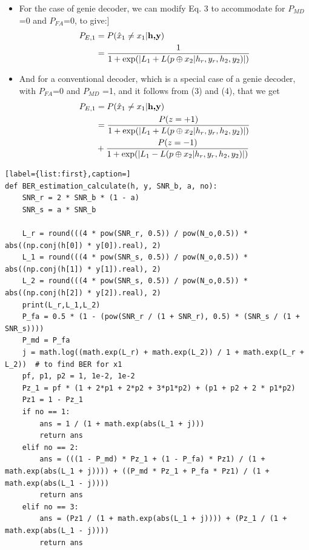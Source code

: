 \documentclass[conference]{IEEEtran}
\begin{document}
\begin{itemize}
\item For the case of genie decoder, we can modify Eq. 3 to accommodate for $P_{MD}$=0 and $P_{FA}$=0, to give:]
\begin{equation}
\begin{split}
P_{E,1} & = P(\hat x_1\neq x_1 | \textbf{h,y})\\
 & = {1\over 1+\exp(| L_{1}+L(p\oplus x_{2}| h_{r},y_{r},h_{2},y_{2})|)}\\
\end{split}
\end{equation}
\item And for a conventional decoder, which is a special case of a genie decoder, with $P_{FA}$=0 and $P_{MD}$ =1, and it follows from (3) and (4), that we get
\begin{equation}
\begin{split}
P_{E,1} & = P(\hat x_1\neq x_1 | \textbf{h,y})\\
 & = {P(z=+1)\over 1+\exp(| L_{1}+L(p\oplus x_{2}| h_{r},y_{r},h_{2},y_{2})|)}\\
 &+ {P(z=-1)\over 1+\exp(|L_{1}-L(p\oplus x_{2}| h_{r},y_{r},h_{2},y_{2})|)}
\end{split}
\end{equation}
\end{itemize}
\begin{lstlisting}[label={list:first},caption=]
def BER_estimation_calculate(h, y, SNR_b, a, no):
    SNR_r = 2 * SNR_b * (1 - a)
    SNR_s = a * SNR_b

    L_r = round(((4 * pow(SNR_r, 0.5)) / pow(N_o,0.5)) * abs((np.conj(h[0]) * y[0]).real), 2)
    L_1 = round(((4 * pow(SNR_s, 0.5)) / pow(N_o,0.5)) * abs((np.conj(h[1]) * y[1]).real), 2)
    L_2 = round(((4 * pow(SNR_s, 0.5)) / pow(N_o,0.5)) * abs((np.conj(h[2]) * y[2]).real), 2)
    print(L_r,L_1,L_2)
    P_fa = 0.5 * (1 - (pow(SNR_r / (1 + SNR_r), 0.5) * (SNR_s / (1 + SNR_s))))
    P_md = P_fa
    j = math.log((math.exp(L_r) + math.exp(L_2)) / 1 + math.exp(L_r + L_2))  # to find BER for x1
    pf, p1, p2 = 1, 1e-2, 1e-2
    Pz_1 = pf * (1 + 2*p1 + 2*p2 + 3*p1*p2) + (p1 + p2 + 2 * p1*p2)
    Pz1 = 1 - Pz_1
    if no == 1:
        ans = 1 / (1 + math.exp(abs(L_1 + j)))
        return ans
    elif no == 2:
        ans = (((1 - P_md) * Pz_1 + (1 - P_fa) * Pz1) / (1 + math.exp(abs(L_1 + j)))) + ((P_md * Pz_1 + P_fa * Pz1) / (1 + math.exp(abs(L_1 - j))))
        return ans
    elif no == 3:
        ans = (Pz1 / (1 + math.exp(abs(L_1 + j)))) + (Pz_1 / (1 + math.exp(abs(L_1 - j))))
        return ans
\end{lstlisting}
\end{document}
